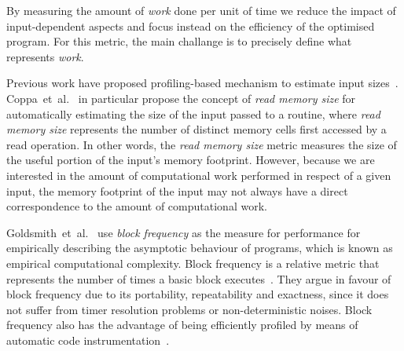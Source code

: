 \documentclass[sigplan,9pt]{acmart}
\newcommand{\etal}{et~al.}
\begin{document}
By measuring the amount of \textit{work} done per unit of time we reduce
the impact of input-dependent aspects and focus instead on the efficiency
of the optimised program.
For this metric, the main challange is to precisely define what
represents \textit{work}.



Previous work have proposed profiling-based mechanism to estimate
input sizes~\cite{zaparanuks12,coppa14}.
Coppa~\etal~\cite{coppa14} in particular propose the concept of
\textit{read memory size} for automatically estimating the size of the input
passed to a routine, where \textit{read memory size} represents the number of
distinct memory cells first accessed by a read operation.
In other words, the \textit{read memory size} metric measures the size of the 
useful portion of the input's memory footprint.
However, because we are interested in the amount of computational work performed
in respect of a given input, the memory footprint of the input may not always
have a direct correspondence to  the amount of computational work.

Goldsmith~\etal~\cite{goldsmith07} use \textit{block frequency} as the
measure for performance for empirically describing the asymptotic behaviour
of programs, which is known as empirical computational complexity.
Block frequency is a relative metric that represents the number of times a
basic block executes~\cite{ball94,ball96}. 
They argue in favour of block frequency due to its portability, repeatability
and exactness, since it does not suffer from timer resolution problems or
non-deterministic noises.
Block frequency also has the advantage of being efficiently profiled by means
of automatic code instrumentation~\cite{knuth73,ball94}.
\end{document}
